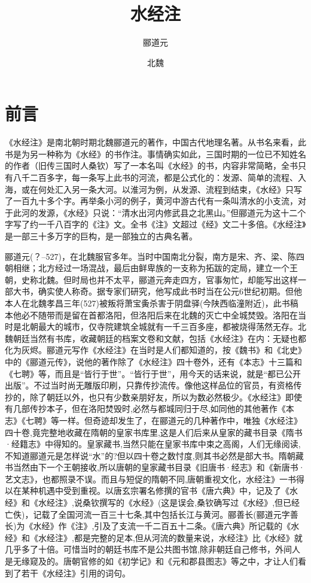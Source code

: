 \documentclass[12pt,UTF8]{ctexbook}
\title{\heiti\zihao{0} 水经注}
\author{郦道元}
\date{北魏}
\begin{document}
\maketitle
\tableofcontents

\frontmatter
\chapter{前言}

《水经注》是南北朝时期北魏郦道元的著作，中国古代地理名著。从书名来看，此书是为另一种称为《水经》的书作注。事情确实如此，三国时期的一位已不知姓名的作者（旧传三国时人桑钦）写了一本名叫《水经》的书，内容非常简略，全书只有八千二百多字，每一条写上此书的河流，都是公式化的：发源、简单的流程、入海，或在何处汇入另一条大河。以淮河为例，从发源、流程到结束，《水经》只写了一百九十多个字。再举条小河的例子，黄河中游古代有一条叫清水的小支流，对于此河的发源，《水经》只说：“清水出河内修武县之北黑山。”但郦道元为这十二个字写了约一千八百字的《注》文。全书《注》文超过《经》文二十多倍。《水经注》是一部三十多万字的巨构，是一部独立的古典名著。

郦道元(？--527)，在北魏服官多年。当时中国南北分裂，南方是宋、齐、梁、陈四朝相继；北方经过一场混战，最后由鲜卑族的一支称为拓跋的定局，建立一个王朝，史称北魏。但时局也并不太平，郦道元奔走四方，官事匆忙，却能写出这样一部大书，确实使人称奇。据专家们研究，他写成此书时当在公元6世纪初期。但他本人在北魏孝昌三年(527)被叛将萧宝夤杀害于阴盘驿(今陕西临潼附近)，此书稿本他必不随带而是留在首都洛阳，但洛阳后来在北魏的灭亡中全城焚毁。洛阳在当时是北朝最大的城市，仅寺院建筑全城就有一千三百多座，都被烧得荡然无存。北魏朝廷当然有书库，收藏朝廷的档案文卷和文献，包括《水经注》在内：无疑也都化为灰烬。郦道元写作《水经注》在当时是人们都知道的，按《魏书》和《北史》中的《郦道元传》，说他的著作除了《水经注》四十卷外，还有《本志》十三篇和《七聘》等，而且是“皆行于世”。“皆行于世”，用今天的话来说，就是“都已公开出版”。不过当时尚无雕版印刷，只靠传抄流传。像他这样品位的官员，有资格传抄的，除了朝廷以外，也只有少数亲朋好友，所以为数必然极少。《水经注》即使有几部传抄本子，但在洛阳焚毁时,必然与都城同归于尽,如同他的其他著作《本志》《七聘》等一样。但奇迹却发生了，在郦道元的几种著作中，唯独《水经注》四十卷,竟完整地收藏在隋朝的皇家书库里,这是人们后来从皇家的藏书目录《隋书·经籍志》中得知的。皇家藏书,当然只能在皇家书库中束之高阁，人们无缘阅读,不知道郦道元是怎样说“水”的?但以四十卷之数忖度,则其书必然是部大书。隋朝藏书当然由下一个王朝接收,所以唐朝的皇家藏书目录《旧唐书·经志》和《新唐书·艺文志》，也都照录不误。而且与短促的隋朝不同,唐朝重视文化，水经注》一书得以在某种机遇中受到重视。以唐玄宗署名修撰的官书《唐六典》中，记及了《水经》和《水经注》,说桑钦撰写的《水经》(这是误会,桑钦确写过《水经》,但已经亡佚)，记载了全国河流一百三十七条,其中包括长江与黄河。郦善长(郦道元字善长)为《水经》作《注》,引及了支流一千二百五十二条。《唐六典》所记载的《水经》和《水经注》,都是完整的足本,但从河流的数量来说，水经注》比《水经》就几乎多了十倍。可惜当时的朝廷书库不是公共图书馆,除非朝廷自己修书，外间人是无缘窥及的。唐朝官修的如《初学记》和《元和郡县图志》等之中，才让人们看到了若干《水经注》引用的词句。
\end{document}
